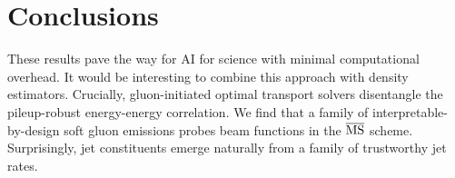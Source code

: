 \section{Conclusions}\label{sec:conclusions}

These results pave the way for AI for science with minimal computational
overhead. It would be interesting to combine this approach with density
estimators. Crucially, gluon-initiated optimal transport solvers
disentangle the pileup-robust energy-energy correlation. We find that a
family of interpretable-by-design soft gluon emissions probes beam
functions in the $\overline{\rm MS}$ scheme. Surprisingly, jet
constituents emerge naturally from a family of trustworthy jet rates.

